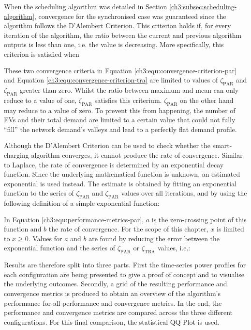 When the scheduling algorithm was detailed in Section \ref{ch3:subsec:scheduling-algorithm}, convergence for the synchronised case was guaranteed since the algorithm follows the D'Alembert Criterion.
This criterion holds if, for every iteration of the algorithm, the ratio between the current and previous algorithm outputs is less than one, i.e. the value is decreasing.
More specifically, this criterion is satisfied when



These two convergence criteria in Equation \ref{ch3:equ:convergence-criterion-par} and Equation \ref{ch3:equ:convergence-criterion-tra} are limited to values of $\zeta_\text{PAR}$ and $\zeta_\text{PAR}$ greater than zero.
Whilst the ratio between maximum and mean can only reduce to a value of one, $\zeta_\text{PAR}$ satisfies this criterium.
$\zeta_\text{PAR}$ on the other hand may reduce to a value of zero.
To prevent this from happening, the number of EVs and their total demand are limited to a certain value that could not fully ``fill'' the network demand's valleys and lead to a perfectly flat demand profile.

Although the D'Alembert Criterion can be used to check whether the smart-charging algorithm converges, it cannot produce the rate of convergence.
Similar to Laplace, the rate of convergence is determined by an exponential decay function.
Since the underlying mathematical function is unknown, an estimated exponential is used instead.
The estimate is obtained by fitting an exponential function to the series of $\zeta_\text{PAR}$ and $\zeta_\text{PAR}$ values over all iterations, and by using the following definition of a simple exponential function:



In Equation \ref{ch3:equ:performance-metrics-par}, $a$ is the zero-crossing point of this function and $b$ the rate of convergence.
For the scope of this chapter, $x$ is limited to $x \geq 0$.
Values for $a$ and $b$ are found by reducing the error between the exponential function and the series of $\zeta_\text{PAR}$ or $\zeta_\text{TRA}$ values, i.e.:



Results are therefore split into three parts.
First the time-series power profiles for each configuration are being presented to give a proof of concept and to visualise the underlying outcomes.
Secondly, a grid of the resulting performance and convergence metrics is produced to obtain an overview of the algorithm's performance for all performance and convergence metrics.
In the end, the performance and convergence metrics are compared across the three different configurations.
For this final comparison, the statistical QQ-Plot is used.



